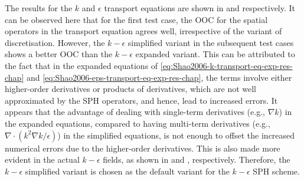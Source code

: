 The results for the $k$ and $\epsilon$ transport equations are shown in  and  respectively. It can be observed here that for the first test case, the OOC for the spatial operators in the transport equation agrees well, irrespective of the variant of discretisation.
However, the $k-\epsilon$ simplified variant in the subsequent test cases shows a better OOC than the $k-\epsilon$ expanded variant.
This can be attributed to the fact that in the expanded equations of \eqref{eq:Shao2006-k-transport-eq-exp-res-chap} and \eqref{eq:Shao2006-eps-transport-eq-exp-res-chap}, the terms involve either higher-order derivatives or products of derivatives, which are not well approximated by the SPH operators, and hence, lead to increased errors. It appears that the advantage of dealing with single-term derivatives (e.g., $\nabla k$) in the expanded equations, compared to having multi-term derivatives (e.g., $\nabla \cdot (k^2\nabla k / \epsilon)$) in the simplified equations, is not enough to offset the increased numerical errors due to the higher-order derivatives.
This is also made more evident in the actual $k-\epsilon$ fields, as shown in  and , respectively.
Therefore, the $k-\epsilon$ simplified variant is chosen as the default variant for the $k-\epsilon$ SPH scheme.

